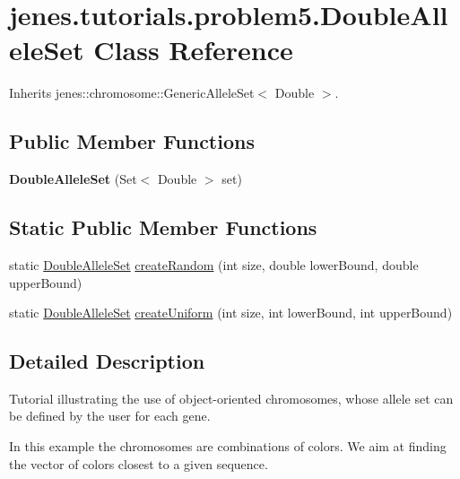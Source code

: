 \hypertarget{classjenes_1_1tutorials_1_1problem5_1_1_double_allele_set}{
\section{jenes.tutorials.problem5.DoubleAlleleSet Class Reference}
\label{classjenes_1_1tutorials_1_1problem5_1_1_double_allele_set}
}
Inherits jenes::chromosome::GenericAlleleSet$<$ Double $>$.

\subsection*{Public Member Functions}
\begin{CompactItemize}
\item 
\hypertarget{classjenes_1_1tutorials_1_1problem5_1_1_double_allele_set_3669132c61485f50aebe440a0602b2e5}{
\textbf{DoubleAlleleSet} (Set$<$ Double $>$ set)}
\label{classjenes_1_1tutorials_1_1problem5_1_1_double_allele_set_3669132c61485f50aebe440a0602b2e5}

\end{CompactItemize}
\subsection*{Static Public Member Functions}
\begin{CompactItemize}
\item 
static \hyperlink{classjenes_1_1tutorials_1_1problem5_1_1_double_allele_set}{DoubleAlleleSet} \hyperlink{classjenes_1_1tutorials_1_1problem5_1_1_double_allele_set_c831f648cab055cd70e3f1b47225529e}{createRandom} (int size, double lowerBound, double upperBound)
\item 
static \hyperlink{classjenes_1_1tutorials_1_1problem5_1_1_double_allele_set}{DoubleAlleleSet} \hyperlink{classjenes_1_1tutorials_1_1problem5_1_1_double_allele_set_75aa1cf3be84d1e3f5e50ecc0acc5b4b}{createUniform} (int size, int lowerBound, int upperBound)
\end{CompactItemize}


\subsection{Detailed Description}
Tutorial illustrating the use of object-oriented chromosomes, whose allele set can be defined by the user for each gene.

In this example the chromosomes are combinations of colors. We aim at finding the vector of colors closest to a given sequence.

